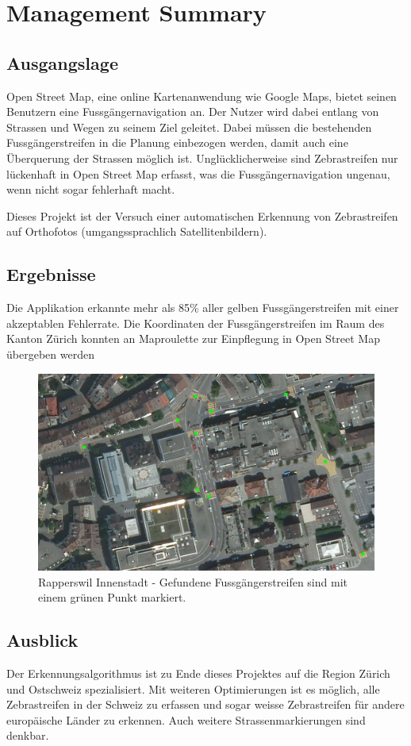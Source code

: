 \section{Management Summary}
\subsection*{Ausgangslage}
Open Street Map, eine online Kartenanwendung wie Google Maps, bietet seinen Benutzern eine Fussgängernavigation an. Der Nutzer wird dabei entlang von Strassen und Wegen zu seinem Ziel geleitet. Dabei müssen die bestehenden Fussgängerstreifen in die Planung einbezogen werden, damit auch eine Überquerung der Strassen möglich ist. Unglücklicherweise sind Zebrastreifen nur lückenhaft in Open Street Map erfasst, was die Fussgängernavigation ungenau, wenn nicht sogar fehlerhaft macht.

Dieses Projekt ist der Versuch einer automatischen Erkennung von Zebrastreifen auf Orthofotos (umgangssprachlich Satellitenbildern).

\subsection*{Ergebnisse}
Die Applikation erkannte mehr als 85\% aller gelben Fussgängerstreifen mit einer akzeptablen Fehlerrate. Die Koordinaten der Fussgängerstreifen im Raum des Kanton Zürich konnten an Maproulette zur Einpflegung in Open Street Map übergeben werden
\\
\begin{figure}[H]
	\centering
	\includegraphics[width=\textwidth -10mm]{images/boxsave_rappi.png}
	\caption[Überblick]{Rapperswil Innenstadt - Gefundene Fussgängerstreifen sind mit einem grünen Punkt markiert.}
\end{figure}
\subsection*{Ausblick}
Der Erkennungsalgorithmus ist zu Ende dieses Projektes auf die Region Zürich und Ostschweiz spezialisiert. Mit weiteren Optimierungen ist es möglich, alle Zebrastreifen in der Schweiz zu erfassen und sogar weisse Zebrastreifen für andere europäische Länder zu erkennen. Auch weitere Strassenmarkierungen sind denkbar.
\newpage